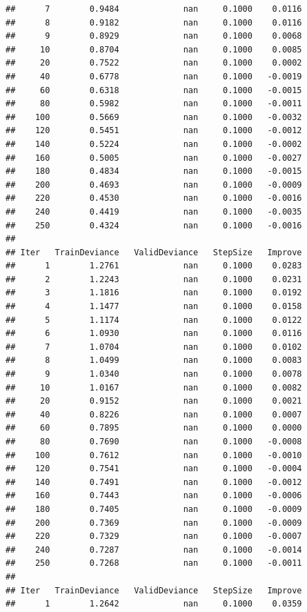 \documentclass[
]{book}
\begin{document}
\begin{verbatim}
##      7        0.9484             nan     0.1000    0.0116
##      8        0.9182             nan     0.1000    0.0116
##      9        0.8929             nan     0.1000    0.0068
##     10        0.8704             nan     0.1000    0.0085
##     20        0.7522             nan     0.1000    0.0002
##     40        0.6778             nan     0.1000   -0.0019
##     60        0.6318             nan     0.1000   -0.0015
##     80        0.5982             nan     0.1000   -0.0011
##    100        0.5669             nan     0.1000   -0.0032
##    120        0.5451             nan     0.1000   -0.0012
##    140        0.5224             nan     0.1000   -0.0002
##    160        0.5005             nan     0.1000   -0.0027
##    180        0.4834             nan     0.1000   -0.0015
##    200        0.4693             nan     0.1000   -0.0009
##    220        0.4530             nan     0.1000   -0.0016
##    240        0.4419             nan     0.1000   -0.0035
##    250        0.4324             nan     0.1000   -0.0016
## 
## Iter   TrainDeviance   ValidDeviance   StepSize   Improve
##      1        1.2761             nan     0.1000    0.0283
##      2        1.2243             nan     0.1000    0.0231
##      3        1.1816             nan     0.1000    0.0192
##      4        1.1477             nan     0.1000    0.0158
##      5        1.1174             nan     0.1000    0.0122
##      6        1.0930             nan     0.1000    0.0116
##      7        1.0704             nan     0.1000    0.0102
##      8        1.0499             nan     0.1000    0.0083
##      9        1.0340             nan     0.1000    0.0078
##     10        1.0167             nan     0.1000    0.0082
##     20        0.9152             nan     0.1000    0.0021
##     40        0.8226             nan     0.1000    0.0007
##     60        0.7895             nan     0.1000    0.0000
##     80        0.7690             nan     0.1000   -0.0008
##    100        0.7612             nan     0.1000   -0.0010
##    120        0.7541             nan     0.1000   -0.0004
##    140        0.7491             nan     0.1000   -0.0012
##    160        0.7443             nan     0.1000   -0.0006
##    180        0.7405             nan     0.1000   -0.0009
##    200        0.7369             nan     0.1000   -0.0009
##    220        0.7329             nan     0.1000   -0.0007
##    240        0.7287             nan     0.1000   -0.0014
##    250        0.7268             nan     0.1000   -0.0011
## 
## Iter   TrainDeviance   ValidDeviance   StepSize   Improve
##      1        1.2642             nan     0.1000    0.0359

\end{verbatim}
\end{document}
